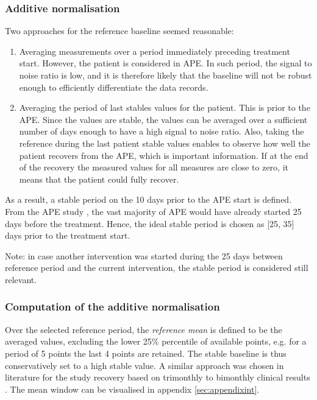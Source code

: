 \subsubsection{Additive normalisation}
Two approaches for the reference baseline seemed reasonable:
\begin{enumerate}
    \item Averaging measurements over a period immediately preceding treatment start. However, the patient is considered in APE. In such period, the signal to noise ratio is low, and it is therefore likely that the baseline will not be robust enough to efficiently differentiate the data records.
    \item Averaging the period of last stables values for the patient. This is prior to the APE. Since the values are stable, the values can be averaged over a sufficient number of days enough to have a high signal to noise ratio. Also, taking the reference during the last patient stable values enables to observe how well the patient recovers from the APE, which is important information. If at the end of the recovery the measured values for all measures are close to zero, it means that the patient could fully recover.
\end{enumerate}

As a result, a stable period on the 10 days prior to the APE start is defined. From the APE study \cite{damian}, the vast majority of APE would have already started 25 days before the treatment. Hence, the ideal stable period is chosen as [25, 35] days prior to the treatment start.

Note: in case another intervention was started during the 25 days between reference period and the current intervention, the stable period is considered still relevant.


\subsubsection{Computation of the additive normalisation}
Over the selected reference period, the \textit{reference mean} is defined to be the averaged values, excluding the lower 25\% percentile of available points, e.g. for a period of 5 points the last 4 points are retained. The stable baseline is thus conservatively set to a high stable value. A similar approach was chosen in literature for the study recovery based on trimonthly to bimonthly clinical results \cite{morgan_2017}. The mean window can be visualised in appendix \ref{sec:appendixint}.

